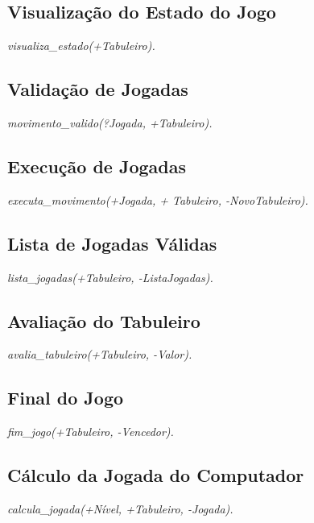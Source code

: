 \documentclass[15pt,a4paper]{article}
\begin{document}
\subsection{Visualização do Estado do Jogo} \textit{visualiza\_estado(+Tabuleiro).}

\subsection{Validação de Jogadas} \textit{movimento\_valido(?Jogada, +Tabuleiro).}

\subsection{Execução de Jogadas}\textit{executa\_movimento(+Jogada, + Tabuleiro, -NovoTabuleiro).}

\subsection{Lista de Jogadas Válidas}\textit{lista\_jogadas(+Tabuleiro, -ListaJogadas).}

\subsection{Avaliação do Tabuleiro}\textit{avalia\_tabuleiro(+Tabuleiro, -Valor).}

\subsection{Final do Jogo} \textit{fim\_jogo(+Tabuleiro, -Vencedor).}

\subsection{Cálculo da Jogada do Computador}\textit{calcula\_jogada(+Nível, +Tabuleiro, -Jogada).}
\end{document}

